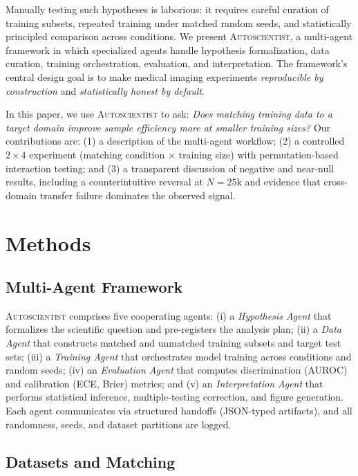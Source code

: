 \documentclass[11pt]{article}
\begin{document}
Manually testing such hypotheses is laborious: it requires careful curation of training subsets, repeated training under matched random seeds, and statistically principled comparison across conditions. We present \textsc{Autoscientist}, a multi-agent framework in which specialized agents handle hypothesis formalization, data curation, training orchestration, evaluation, and interpretation. The framework's central design goal is to make medical imaging experiments \emph{reproducible by construction} and \emph{statistically honest by default}.

In this paper, we use \textsc{Autoscientist} to ask: \emph{Does matching training data to a target domain improve sample efficiency more at smaller training sizes?} Our contributions are: (1) a description of the multi-agent workflow; (2) a controlled $2 \times 4$ experiment (matching condition $\times$ training size) with permutation-based interaction testing; and (3) a transparent discussion of negative and near-null results, including a counterintuitive reversal at $N=25\text{k}$ and evidence that cross-domain transfer failure dominates the observed signal.

\section{Methods}

\subsection{Multi-Agent Framework}

\textsc{Autoscientist} comprises five cooperating agents: (i) a \emph{Hypothesis Agent} that formalizes the scientific question and pre-registers the analysis plan; (ii) a \emph{Data Agent} that constructs matched and unmatched training subsets and target test sets; (iii) a \emph{Training Agent} that orchestrates model training across conditions and random seeds; (iv) an \emph{Evaluation Agent} that computes discrimination (AUROC) and calibration (ECE, Brier) metrics; and (v) an \emph{Interpretation Agent} that performs statistical inference, multiple-testing correction, and figure generation. Each agent communicates via structured handoffs (JSON-typed artifacts), and all randomness, seeds, and dataset partitions are logged.

\subsection{Datasets and Matching}
\end{document}
